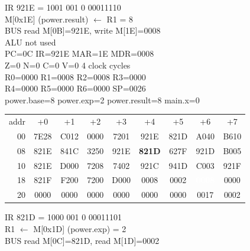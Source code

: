 \noindent\begin{tcolorbox}[stepbox, title={Step 16 \hfill PC 0B \quad ST R1, power.result}]
\textcolor{dim}{IR} 921E = 1001 001 0 00011110\\
M[0x1E] (power.result) $\leftarrow$ R1 = 8\\
\textcolor{dim}{BUS} read M[0B]=921E, \textcolor{wrt}{write M[1E]=0008}\\
\textcolor{dim}{ALU} \textcolor{dim}{not used}\\
PC=0C IR=921E MAR=1E MDR=0008\\
Z=0 N=0 C=0 V=0 \hfill \textcolor{dim}{4 clock cycles}\\
R0=0000 R1=0008 R2=0008 R3=0000\\
R4=0000 R5=0000 R6=0000 SP=0026\\
\textcolor{dim}{power.base=8  power.exp=2  power.result=8  main.x=0}\\[1pt]
{\setlength{\tabcolsep}{1.6pt}\begin{tabular}{@{}r*{8}{c}@{}}
\textcolor{dim}{addr} & \textcolor{dim}{+0} & \textcolor{dim}{+1} & \textcolor{dim}{+2} & \textcolor{dim}{+3} & \textcolor{dim}{+4} & \textcolor{dim}{+5} & \textcolor{dim}{+6} & \textcolor{dim}{+7}\\
\textcolor{dim}{00} & 7E28 & C012 & 0000 & 7201 & 921E & 821D & A040 & B610\\
\textcolor{dim}{08} & 821E & 841C & 3250 & 921E & \cellcolor{pcc}\textbf{821D} & 627F & 921D & B005\\
\textcolor{dim}{10} & 821E & D000 & 7208 & 7402 & 921C & 941D & C003 & 921F\\
\textcolor{dim}{18} & 821F & F200 & 7200 & D000 & \cellcolor{datac}0008 & \cellcolor{datac}0002 & \cellcolor{wrt}\textcolor{white}{\textbf{0008}} & \cellcolor{datac}0000\\
\textcolor{dim}{20} & \cellcolor{stackc}0000 & \cellcolor{stackc}0000 & \cellcolor{stackc}0000 & \cellcolor{stackc}0000 & \cellcolor{stackc}0000 & \cellcolor{stackc}0000 & \cellcolor{stackc}0017 & \cellcolor{stackc}0002\\
\end{tabular}}
\end{tcolorbox}\hfill\begin{tcolorbox}[stepbox, title={Step 17 \hfill PC 0C \quad LD R1, power.exp}]
\textcolor{dim}{IR} 821D = 1000 001 0 00011101\\
R1 $\leftarrow$ M[0x1D] (power.exp) = 2\\
\textcolor{dim}{BUS} read M[0C]=821D, read M[1D]=0002\\

\end{tcolorbox}
